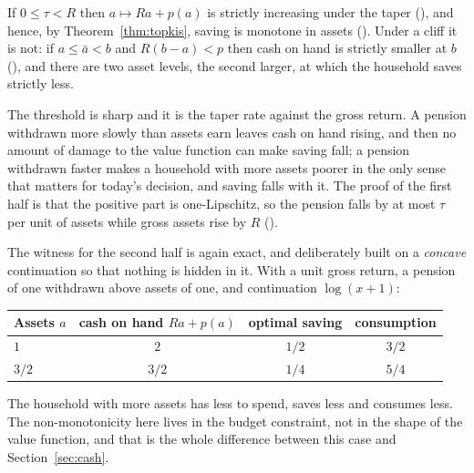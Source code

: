 \begin{theorem}\label{thm:taper}
If $0\le\tau<R$ then $a\mapsto Ra+p(a)$ is strictly increasing under the taper
(), and hence, by Theorem~\ref{thm:topkis}, saving is monotone in
assets (). Under a cliff it is not: if $a\le\bar a<b$ and
$R(b-a)<p$ then cash on hand is strictly smaller at $b$ (), and
there are two asset levels, the second larger, at which the household saves strictly less.
\end{theorem}

The threshold is sharp and it is the taper rate against the gross return. A pension withdrawn more
slowly than assets earn leaves cash on hand rising, and then no amount of damage to the value
function can make saving fall; a pension withdrawn faster makes a household with more assets poorer
in the only sense that matters for today's decision, and saving falls with it. The proof of the
first half is that the positive part is one-Lipschitz, so the pension falls by at most $\tau$ per
unit of assets while gross assets rise by $R$ ().

The witness for the second half is again exact, and deliberately built on a \emph{concave}
continuation so that nothing is hidden in it. With a unit gross return, a pension of one withdrawn
above assets of one, and continuation $\log(x+1)$:

\begingroup\small
\begin{center}
\begin{tabular}{@{}lccc@{}}
\toprule
Assets $a$ & cash on hand $Ra+p(a)$ & optimal saving & consumption\\
\midrule
$1$ & $2$ & $1/2$ & $3/2$\\
$3/2$ & $3/2$ & $1/4$ & $5/4$\\
\bottomrule
\end{tabular}
\end{center}
\endgroup

The household with more assets has less to spend, saves less and consumes less. The
non-monotonicity here lives in the budget constraint, not in the shape of the value function, and
that is the whole difference between this case and Section~\ref{sec:cash}.
